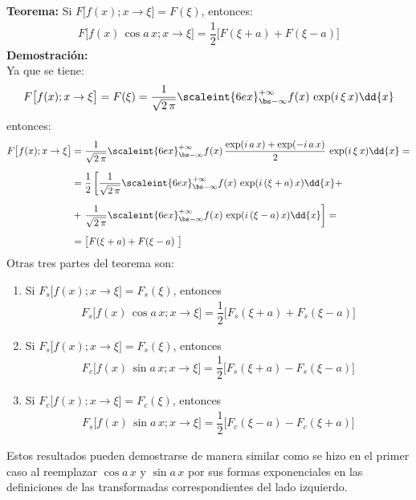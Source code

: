 \textbf{Teorema:} Si $F \big[ f (x); x \to \xi \big] = F (\xi)$, entonces:
\begin{align*}
F \big[ f (x) \, \cos a \, x; x \to \xi \big] = \dfrac{1}{2} \big[F(\xi + a) + F(\xi - a) \big]
\end{align*}
\textbf{Demostración:}
\\
Ya que se tiene:
\begin{align*}
F \big[f (x); x \to \xi \big] = F (\xi) = \dfrac{1}{\sqrt{2 \, \pi}} \scaleint{6ex}_{\bs -\infty}^{+\infty} f (x) \, \exp(i \, \xi \, x) \dd{x}
\end{align*}
entonces:
\begin{align*}
F \big[ f (x); x \to \xi \big] &= \dfrac{1}{\sqrt{2 \, \pi}} \scaleint{6ex}_{\bs -\infty}^{+\infty} f (x) \, \dfrac{\exp(i \, a \, x) + \exp(-i \, a \, x)}{2} \, \exp(i \, \xi \, x) \dd{x} = \\[0.5em]
&= \dfrac{1}{2} \left[ \dfrac{1}{\sqrt{2 \, \pi}} \scaleint{6ex}_{\bs -\infty}^{+\infty} f (x) \, \exp(i \, (\xi + a) \, x)  \dd{x} + \right. \\[0.5em]
&+ \left. \dfrac{1}{\sqrt{2 \, \pi}} \scaleint{6ex}_{\bs -\infty}^{+\infty} f (x) \, \exp(i \, (\xi - a) \, x)  \dd{x} \right] = \\[0.5em]
&= \big[ F(\xi + a) + F (\xi - a) \big]
\end{align*}
Otras tres partes del teorema son:
\begin{enumerate}[label=\alph*)]
\item Si $F_{s} \big[ f (x); x \to \xi \big] = F_{s} (\xi)$, entonces
\begin{align*}
F_{s} \big[ f (x) \, \cos a \, x; x \to \xi \big] = \dfrac{1}{2} \big[ F_{s} (\xi +  a) + F_{s} (\xi - a) \big]
\end{align*}
\item Si $F_{s} \big[ f (x); x \to \xi \big] = F_{s} (\xi)$, entonces
\begin{align*}
F_{c} \big[ f (x) \, \sin a \, x; x \to \xi \big] = \dfrac{1}{2} \big[ F_{s} (\xi +  a) - F_{s} (\xi - a) \big]
\end{align*}
\item Si $F_{c} \big[f (x); x \to \xi \big] = F_{c} (\xi)$, entonces
\begin{align*}
F_{s} \big[f (x) \, \sin a \, x; x \to \xi \big] = \dfrac{1}{2} \big[ F_{c} (\xi -  a) - F_{c} (\xi + a) \big]
\end{align*}
\end{enumerate}
Estos resultados pueden demostrarse de manera similar como se hizo en el primer caso al reemplazar $\cos a \, x$ y $\sin a \, x$ por sus formas exponenciales en las definiciones de las transformadas correspondientes del lado izquierdo.


